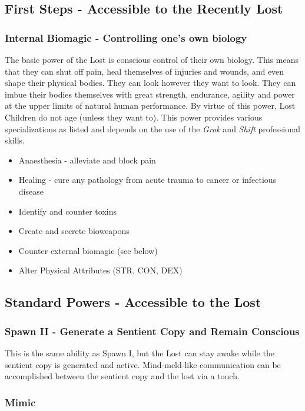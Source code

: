 \documentclass[letterpaper,serif]{rpg-module}
\begin{document}
\subsection{First Steps - Accessible to the Recently Lost}

\subsubsection{Internal Biomagic - Controlling one's own biology }

The basic power of the Lost is conscious control of their own biology. This means that they can shut off pain, heal themselves of injuries and wounds, and even shape their physical bodies. They can look however they want to look. They can imbue their bodies themselves with great strength, endurance, agility and power at the upper limits of natural human performance. By virtue of this power, Lost Children do not age (unless they want to). This power provides various specializations as listed and depends on the use of the \textit{Grok} and \textit{Shift} professional skills. 
\begin{itemize}
	\item Anaesthesia - alleviate and block pain
	\item Healing - cure any pathology from acute trauma to cancer or infectious disease
	\item Identify and counter toxins
	\item Create and secrete bioweapons
	\item Counter external biomagic (see below)
	\item Alter Physical Attributes (STR, CON, DEX)
\end{itemize}

\subsection{Standard Powers - Accessible to the Lost}

 \subsubsection{Spawn II - Generate a Sentient Copy and Remain Conscious}
 
This is the same ability as Spawn I, but the Lost can stay awake while the sentient copy is generated and active. Mind-meld-like communication can be accomplished between the sentient copy and the lost via a touch. 

\subsubsection{Mimic}
\end{document}
